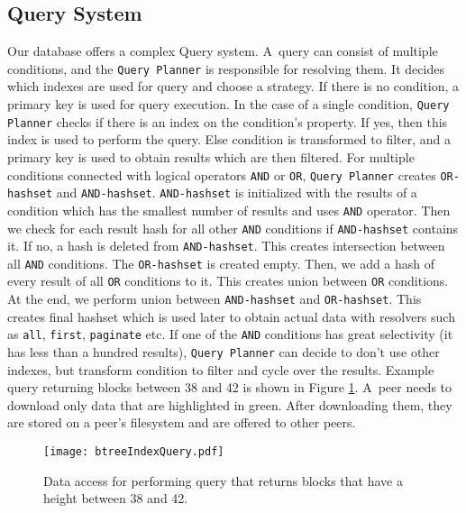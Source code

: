 \subsection{Query System}
Our database offers a complex Query system. A~query can consist of multiple conditions, and the \texttt{Query Planner} is responsible for resolving them. It decides which indexes are used for query and choose a strategy. If there is no condition, a primary key is used for query execution. In the case of a single condition, \texttt{Query Planner} checks if there is an index on the condition's property. If yes, then this index is used to perform the query. Else condition is transformed to filter, and a primary key is used to obtain results which are then filtered. For multiple conditions connected with logical operators \texttt{AND} or \texttt{OR}, \texttt{Query Planner} creates \texttt{OR-hashset} and \texttt{AND-hashset}. \texttt{AND-hashset} is initialized with the results of a condition which has the smallest number of results and uses \texttt{AND} operator. Then we check for each result hash for all other \texttt{AND} conditions if \texttt{AND-hashset} contains it. If no, a hash is deleted from \texttt{AND-hashset}. This creates intersection between all \texttt{AND} conditions. The \texttt{OR-hashset} is created empty. Then, we add a hash of every result of all \texttt{OR} conditions to it. This creates union between \texttt{OR} conditions. At the end, we perform union between \texttt{AND-hashset} and \texttt{OR-hashset}. This creates final hashset which is used later to obtain actual data with resolvers such as \texttt{all}, \texttt{first}, \texttt{paginate} etc. If one of the \texttt{AND} conditions has great selectivity (it has less than a hundred results), \texttt{Query Planner} can decide to don't use other indexes, but transform condition to filter and cycle over the results. Example query returning blocks between 38 and 42 is shown in Figure \ref{btreeQuery}. A~peer needs to download only data that are highlighted in green. After downloading them, they are stored on a peer's filesystem and are offered to other peers. 

\begin{figure}[h]
    \centering
    \texttt{[image: btreeIndexQuery.pdf]}
    \caption{Data access for performing query that returns blocks that have a height between 38 and 42.}
    \label{btreeQuery}
\end{figure}



